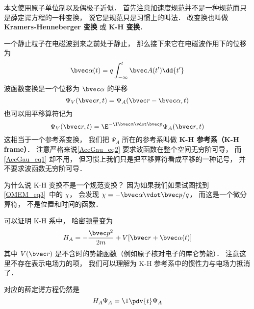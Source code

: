 

本文使用原子单位制以及偶极子近似． 首先注意加速度规范并不是一种规范而只是薛定谔方程的一种变换， 说它是规范只是习惯上的叫法． 改变换也叫做 \textbf{Kramers-Henneberger 变换} 或 \textbf{K-H 变换}．

一个静止粒子在电磁波到来之前处于静止， 那么接下来它在电磁波作用下的位移为
\begin{equation}
\bvec \alpha(t) = q\int_{-\infty}^t \bvec A(t') \dd{t'}
\end{equation}
波函数变换是一个位移为 $\bvec \alpha$ 的平移
\begin{equation}\label{AccGau_eq1}
\Psi_V(\bvec r, t) = \Psi_A(\bvec r - \bvec \alpha, t)
\end{equation}
也可以用平移算符记为
\begin{equation}\label{AccGau_eq2}
\Psi_V(\bvec r, t) = \E^{-\I \bvec \alpha \vdot \bvec p} \Psi_A(\bvec r, t)
\end{equation}
这相当于一个参考系变换， 我们把 $\Psi_A$ 所在的参考系叫做 \textbf{K-H 参考系（K-H frame）}． 注意严格来说\autoref{AccGau_eq2} 要求波函数在整个空间无穷阶可导， 而\autoref{AccGau_eq1} 却不用， 但习惯上我们只是把平移算符看成平移的一种记号， 并不要求波函数无穷阶可导．

为什么说 K-H 变换不是一个规范变换？ 因为如果我们如果试图找到\autoref{QMEM_eq3}~中的 $\chi$， 会发现 $\chi = -\bvec \alpha \vdot \bvec p/q$， 而这是一个微分算符， 不是位置和时间的函数．

可以证明 K-H 系中， 哈密顿量变为
\begin{equation}
H_A = -\frac{\bvec p^2}{2m} + V[\bvec r + \bvec \alpha(t)]
\end{equation}
其中 $V(\bvec r)$ 是不含时的势能函数（例如原子核对电子的库仑势能）． 注意这里不存在表示电场力的项， 我们可以理解为 K-H 参考系中的惯性力与电场力抵消了．

对应的薛定谔方程仍然是
\begin{equation}
H_A \Psi_A = \I \pdv{t} \Psi_A
\end{equation}
